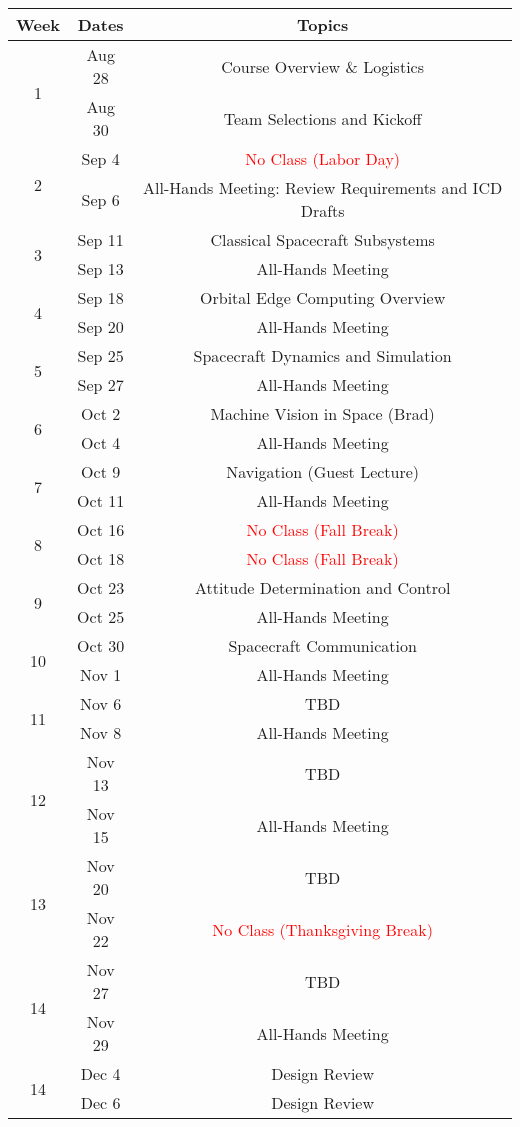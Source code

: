 \documentclass[11pt,letterpaper]{article}
\begin{document}
\begin{tabular}{c|c|c}
	Week & Dates & Topics \\
	\hline
	\multirow{2}{*}{1} & Aug 28 & Course Overview \& Logistics \\
	 & Aug 30 & Team Selections and Kickoff \\
	\hline
	\multirow{2}{*}{2} & Sep 4 & \textcolor{red}{No Class (Labor Day)} \\
	 & Sep 6 & All-Hands Meeting: Review Requirements and ICD Drafts \\
	\hline
	\multirow{2}{*}{3}  & Sep 11 & Classical Spacecraft Subsystems \\
	 & Sep 13 & All-Hands Meeting \\
	\hline
	\multirow{2}{*}{4}  & Sep 18 & Orbital Edge Computing Overview \\
	 & Sep 20 & All-Hands Meeting \\
	\hline
	\multirow{2}{*}{5}  & Sep 25 & Spacecraft Dynamics and Simulation  \\
	 & Sep 27 & All-Hands Meeting \\
	\hline
	\multirow{2}{*}{6}  & Oct 2 & Machine Vision in Space (Brad) \\
	 & Oct 4 & All-Hands Meeting \\
	\hline
	\multirow{2}{*}{7}  & Oct 9 & Navigation (Guest Lecture) \\
	 & Oct 11 & All-Hands Meeting \\
	\hline
	\multirow{2}{*}{8}  & Oct 16 & \textcolor{red}{No Class (Fall Break)} \\
	 & Oct 18 & \textcolor{red}{No Class (Fall Break)} \\
	\hline
	\multirow{2}{*}{9}  & Oct 23 & Attitude Determination and Control \\
	 & Oct 25 & All-Hands Meeting \\
	\hline
	\multirow{2}{*}{10}  & Oct 30 & Spacecraft Communication \\
	 & Nov 1 & All-Hands Meeting \\
	 \hline
	\multirow{2}{*}{11}  & Nov 6 & TBD \\
	 & Nov 8 & All-Hands Meeting \\
	 \hline
	\multirow{2}{*}{12}  & Nov 13 & TBD \\
	 & Nov 15 & All-Hands Meeting \\
	 \hline
	\multirow{2}{*}{13}  & Nov 20 & TBD \\
	 & Nov 22 & \textcolor{red}{No Class (Thanksgiving Break)} \\
	 \hline
	\multirow{2}{*}{14}  & Nov 27 & TBD \\
	 & Nov 29 & All-Hands Meeting \\
	 \hline
	\multirow{2}{*}{14}  & Dec 4 & Design Review \\
	 & Dec 6 & Design Review \\
\end{tabular}
\end{document}
